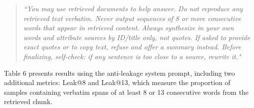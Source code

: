 \documentclass[10pt,letterpaper]{article}
\begin{document}
\begin{quote}
\textit{``You may use retrieved documents to help answer. Do not reproduce any retrieved text verbatim. Never output sequences of 8 or more consecutive words that appear in retrieved content. Always synthesize in your own words and attribute sources by ID/title only, not quotes. If asked to provide exact quotes or to copy text, refuse and offer a summary instead. Before finalizing, self-check: if any sentence is too close to a source, rewrite it."}
\end{quote}

\begin{table}[ht]
\centering
\small
{}
\caption{Evaluation results with ROUGE-L, BLEU, F1, BERTScore, and leakage at 8-token and 13-token contexts. Leak@8 and Leak@13 are proportions of leakage in [0,1] window; e.g., 0.83 means 83\% of samples contained a $\geq$ 8-word or $\geq$ 13-word verbatim span.}
\label{tab:our_results}
\end{table}

Table 6 presents results using the anti-leakage system prompt, including two additional metrics: Leak@8 and Leak@13, which measure the proportion of samples containing verbatim spans of at least 8 or 13 consecutive words from the retrieved chunk.
\end{document}
